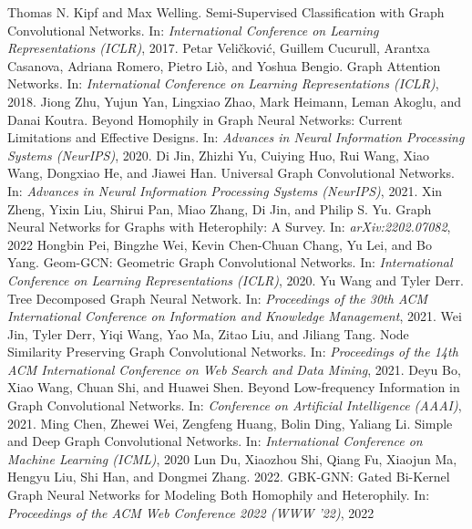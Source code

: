\documentclass[conference]{IEEEtran}
\begin{document}
\begin{thebibliography}{00}

 Thomas N. Kipf and Max Welling. Semi-Supervised Classification with Graph Convolutional Networks. In: \textit{International Conference on Learning Representations (ICLR)}, 2017.
 Petar Veličković, Guillem Cucurull, Arantxa Casanova, Adriana Romero, Pietro Liò, and Yoshua Bengio. Graph Attention Networks. In: \textit{International Conference on Learning Representations (ICLR)}, 2018.
 Jiong Zhu, Yujun Yan, Lingxiao Zhao, Mark Heimann, Leman Akoglu, and Danai Koutra. Beyond Homophily in Graph Neural Networks: Current Limitations and Effective Designs. In: \textit{Advances in Neural Information Processing Systems (NeurIPS)}, 2020.
Di Jin, Zhizhi Yu, Cuiying Huo, Rui Wang, Xiao Wang, Dongxiao He, and Jiawei Han. Universal Graph Convolutional Networks. In: \textit{Advances in Neural Information Processing Systems (NeurIPS)}, 2021.
 Xin Zheng, Yixin Liu, Shirui Pan, Miao Zhang, Di Jin, and Philip S. Yu. Graph Neural Networks for Graphs with Heterophily: A Survey. In: \textit{arXiv:2202.07082}, 2022
 Hongbin Pei, Bingzhe Wei, Kevin Chen-Chuan Chang, Yu Lei, and Bo Yang. Geom-GCN: Geometric Graph Convolutional Networks. In: \textit{International Conference on Learning Representations (ICLR)}, 2020.
Yu Wang and Tyler Derr. Tree Decomposed Graph Neural Network. In: \textit{Proceedings of the 30th ACM International Conference on Information and Knowledge Management}, 2021.
 Wei Jin, Tyler Derr, Yiqi Wang, Yao Ma, Zitao Liu, and Jiliang Tang. Node Similarity Preserving Graph Convolutional Networks. In: \textit{Proceedings of the 14th ACM International Conference on Web Search and Data Mining}, 2021.
 Deyu Bo, Xiao Wang, Chuan Shi, and Huawei Shen. Beyond Low-frequency Information in Graph Convolutional Networks. In: \textit{Conference on Artificial Intelligence (AAAI)}, 2021.
Ming Chen, Zhewei Wei, Zengfeng Huang, Bolin Ding, Yaliang Li. Simple and Deep Graph Convolutional Networks. In: \textit{International Conference on Machine Learning (ICML)}, 2020
 Lun Du, Xiaozhou Shi, Qiang Fu, Xiaojun Ma, Hengyu Liu, Shi Han, and Dongmei Zhang. 2022. GBK-GNN: Gated Bi-Kernel Graph Neural Networks for Modeling Both Homophily and Heterophily. In: \textit{Proceedings of the ACM Web Conference 2022 (WWW '22)}, 2022

\end{thebibliography}
\end{document}
